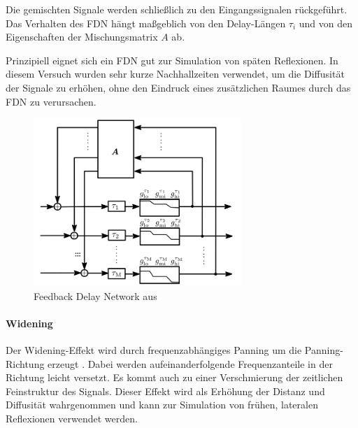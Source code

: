 Die gemischten Signale werden schließlich zu den Eingangssignalen rückgeführt. Das Verhalten des FDN hängt maßgeblich von den Delay-Längen $\tau_i$ und von den Eigenschaften der Mischungsmatrix $A$ ab.

Prinzipiell eignet sich ein FDN gut zur Simulation von späten Reflexionen. In diesem Versuch wurden sehr kurze Nachhallzeiten verwendet, um die Diffusität der Signale zu erhöhen, ohne den Eindruck eines zusätzlichen Raumes durch das FDN zu verursachen.

\begin{figure}[!ht]
  \centering
  \includegraphics[width=0.7\textwidth]{dekorrelation/pic/zotter_fdn.png}
  \caption{Feedback Delay Network aus \cite{ambi-book}}
  \label{fig:fdn}
\end{figure}


\paragraph{Widening}
Der Widening-Effekt wird durch frequenzabhängiges Panning um die Panning-Richtung erzeugt \cite{ambi-book}. Dabei werden aufeinanderfolgende Frequenzanteile in der Richtung leicht versetzt. Es kommt auch zu einer Verschmierung der zeitlichen Feinstruktur des Signals. Dieser Effekt wird als Erhöhung der Distanz und Diffusität wahrgenommen und kann zur Simulation von frühen, lateralen Reflexionen verwendet werden.
